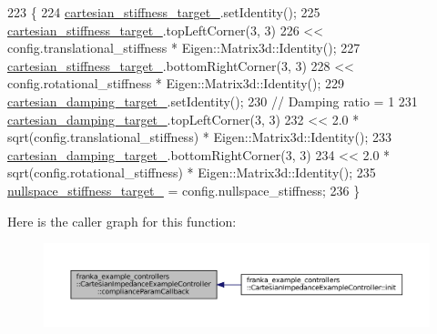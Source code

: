 \begin{DoxyCode}
223                 \{
224   \hyperlink{classfranka__example__controllers_1_1CartesianImpedanceExampleController_ab31e4b0d375e011ea3e3f745a6cfdded}{cartesian\_stiffness\_target\_}.setIdentity();
225   \hyperlink{classfranka__example__controllers_1_1CartesianImpedanceExampleController_ab31e4b0d375e011ea3e3f745a6cfdded}{cartesian\_stiffness\_target\_}.topLeftCorner(3, 3)
226       << config.translational\_stiffness * Eigen::Matrix3d::Identity();
227   \hyperlink{classfranka__example__controllers_1_1CartesianImpedanceExampleController_ab31e4b0d375e011ea3e3f745a6cfdded}{cartesian\_stiffness\_target\_}.bottomRightCorner(3, 3)
228       << config.rotational\_stiffness * Eigen::Matrix3d::Identity();
229   \hyperlink{classfranka__example__controllers_1_1CartesianImpedanceExampleController_afcb20af974815ddd883d1039ab554cc1}{cartesian\_damping\_target\_}.setIdentity();
230   \textcolor{comment}{// Damping ratio = 1}
231   \hyperlink{classfranka__example__controllers_1_1CartesianImpedanceExampleController_afcb20af974815ddd883d1039ab554cc1}{cartesian\_damping\_target\_}.topLeftCorner(3, 3)
232       << 2.0 * sqrt(config.translational\_stiffness) * Eigen::Matrix3d::Identity();
233   \hyperlink{classfranka__example__controllers_1_1CartesianImpedanceExampleController_afcb20af974815ddd883d1039ab554cc1}{cartesian\_damping\_target\_}.bottomRightCorner(3, 3)
234       << 2.0 * sqrt(config.rotational\_stiffness) * Eigen::Matrix3d::Identity();
235   \hyperlink{classfranka__example__controllers_1_1CartesianImpedanceExampleController_a3bfebd283e81cab2a5d303d75ba5a706}{nullspace\_stiffness\_target\_} = config.nullspace\_stiffness;
236 \}
\end{DoxyCode}
Here is the caller graph for this function\+:
\nopagebreak
\begin{figure}[H]
\begin{center}
\leavevmode
\includegraphics[width=350pt]{classfranka__example__controllers_1_1CartesianImpedanceExampleController_a31f27ea8c8f60f073fb50c78cf48ab6c_icgraph}
\end{center}
\end{figure}
\mbox{\label{classfranka__example__controllers_1_1CartesianImpedanceExampleController_a84a8c0fb5fbb0c273910d1af68fabe0b}} 
